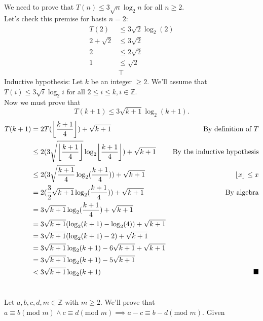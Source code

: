 \documentclass{article}
\DeclarePairedDelimiter{\floor}{\lfloor}{\rfloor}
\begin{document}
\subsection{}
We need to prove that $T(n) \leq 3\sqrt{n}\log_2 n$ for all $n\geq 2$.\\
Let's check this premise for basis $n=2$:
\begin{align*}
    T(2) &\leq 3\sqrt{2}\log_2(2) \\
    2 + \sqrt{2} &\leq 3\sqrt{2} \\
    2 &\leq 2\sqrt{2} \\
    1 &\leq \sqrt{2} \\
    &\top
\end{align*}
Inductive hypothesis: Let $k$ be an integer $\geq 2$. We'll assume that $T(i) \leq 3\sqrt{i}\log_2 i$ for all $2 \leq i\leq k, i\in \mathbb{Z}$.\\
Now we must prove that
\begin{equation*}
    T(k+1) \leq 3\sqrt{k+1}\log_2(k+1).
\end{equation*}
\begin{align*}
    T(k+1) &= 2T(\floor*{\frac{k+1}{4}}) + \sqrt{k+1} & \text{By definition of $T$}\\
           &\leq 2(3\sqrt{\floor*{\frac{k+1}{4}}}\log_2\floor*{\frac{k+1}{4}}) + \sqrt{k+1} & \text{By the inductive hypothesis} \\
           &\leq 2(3\sqrt{\frac{k+1}{4}}\log_2(\frac{k+1}{4})) + \sqrt{k+1} & \floor{x} \leq x \\
           &= 2(\frac{3}{2}\sqrt{k+1}\log_2(\frac{k+1}{4})) + \sqrt{k+1} & \text{By algebra} \\
           &= 3\sqrt{k+1}\log_2(\frac{k+1}{4}) + \sqrt{k+1} \\
           &= 3\sqrt{k+1}(\log_2(k+1) - \log_2(4)) + \sqrt{k+1} \\
           &= 3\sqrt{k+1}(\log_2(k+1) - 2) + \sqrt{k+1} \\
           &= 3\sqrt{k+1}\log_2(k+1) - 6\sqrt{k+1} + \sqrt{k+1} \\
           &= 3\sqrt{k+1}\log_2(k+1) - 5\sqrt{k+1} \\
           &< 3\sqrt{k+1}\log_2(k+1)                                    &\blacksquare
\end{align*}

\section{}
Let $a,b,c,d,m \in \mathbb{Z}$ with $m \geq 2$. We'll prove that $a \equiv b (\text{mod } m) \wedge c \equiv d (\text{mod } m) \implies a-c\equiv b-d (\text{mod } m)$. Given
\end{document}
